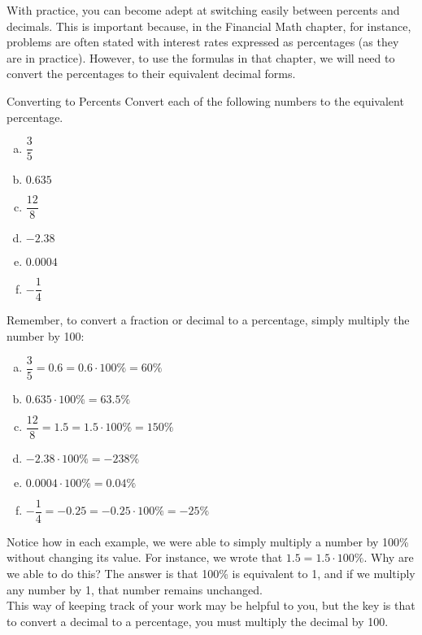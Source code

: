 With practice, you can become adept at switching easily between percents and decimals.  This is important because, in the Financial Math chapter, for instance, problems are often stated with interest rates expressed as percentages (as they are in practice).  However, to use the formulas in that chapter, we will need to convert the percentages to their equivalent decimal forms.
\vfill

\text{}
\pagebreak

\begin{example}{Converting to Percents}
Convert each of the following numbers to the equivalent percentage.
\begin{enumerate}[(a)]
\item $\dfrac{3}{5}$
\item $0.635$
\item $\dfrac{12}{8}$
\item $-2.38$
\item $0.0004$
\item $-\dfrac{1}{4}$
\end{enumerate}

\sol
Remember, to convert a fraction or decimal to a percentage, simply multiply the number by 100:

\begin{enumerate}[(a)]
\item $\dfrac{3}{5} = 0.6 = 0.6 \cdot 100\% = \boxed{60\%}$
\item $0.635 \cdot 100\% = \boxed{63.5\%}$
\item $\dfrac{12}{8} = 1.5 = 1.5 \cdot 100\% = \boxed{150\%}$
\item $-2.38 \cdot 100\% = \boxed{-238\%}$
\item $0.0004 \cdot 100\% = \boxed{0.04\%}$
\item $-\dfrac{1}{4} = -0.25 = -0.25 \cdot 100\% = \boxed{-25\%}$
\end{enumerate}

Notice how in each example, we were able to simply multiply a number by 100\% without changing its value.  For instance, we wrote that $1.5 = 1.5 \cdot 100\%$.  Why are we able to do this?  The answer is that 100\% is equivalent to 1, and if we multiply any number by 1, that number remains unchanged.\\

This way of keeping track of your work may be helpful to you, but the key is that to convert a decimal to a percentage, you must multiply the decimal by 100.
\end{example}


